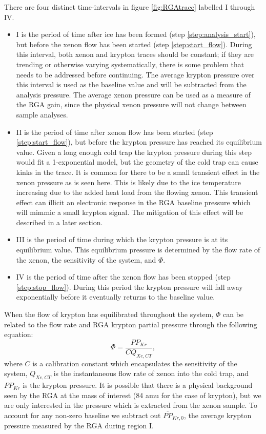 There are four distinct time-intervals in figure \ref{fig:RGAtrace} labelled I through IV. 
\begin{itemize}
\item I is the period of time after ice has been formed (step \ref{step:analysis_start}), but before the xenon flow has been started (step \ref{step:start_flow}). During this interval, both xenon and krypton traces should be constant; if they are trending or otherwise varying systematically, there is some problem that needs to be addressed before continuing. The average krypton pressure over this interval is used as the baseline value and will be subtracted from the analysis pressure. The average xenon pressure can be used as a measure of the RGA gain, since the physical xenon pressure will not change between sample analyses. 
\item II is the period of time after xenon flow has been started (step \ref{step:start_flow}), but before the krypton pressure has reached its equilibrium value. Given a long enough cold trap the krypton pressure during this step would fit a 1-exponential model, but the geometry of the cold trap can cause kinks in the trace. It is common for there to be a small transient effect in the xenon pressure as is seen here. This is likely due to the ice temperature increasing due to the added heat load from the flowing xenon. This transient effect can illicit an electronic response in the RGA baseline pressure which will mimmic a small krypton signal. The mitigation of this effect will be described in a later section.
\item III is the period of time during which the krypton pressure is at its equilibrium value. This equilibrium pressure is determined by the flow rate of the xenon, the sensitivity of the system, and $\Phi$.
\item IV is the period of time after the xenon flow has been stopped (step \ref{step:stop_flow}). During this period the krypton pressure will fall away exponentially before it eventually returns to the baseline value.
\end{itemize}

When the flow of krypton has equilibrated throughout the system, $\Phi$ can be related to the flow rate and RGA krypton partial pressure through the following equation: 
\begin{equation}
\label{eq:basic_analysis}
\Phi=\frac{PP_{Kr}}{CQ_{Xe,CT}},
\end{equation}
where $C$ is a calibration constant which encapsulates the sensitivity of the system, $Q_{Xe,CT}$ is the instantaneous flow rate of xenon into the cold trap, and $PP_{Kr}$ is the krypton pressure. It is possible that there is a physical background seen by the RGA at the mass of interest (84 amu for the case of krypton), but we are only interested in the pressure which is extracted from the xenon sample. To account for any non-zero baseline we subtract out $\overline{PP}_{Kr,0}$, the average krypton pressure measured by the RGA during region I. 


